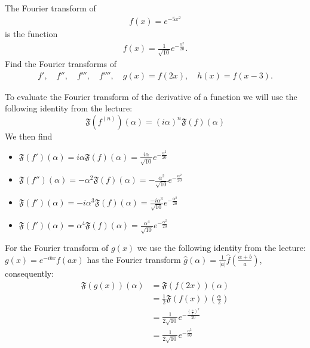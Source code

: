 \documentclass[11pt]{article}
\begin{document}

\begin{exercise}
    The Fourier transform of 
    \begin{align*}
        f(x) = e^{-5x^2}
    \end{align*}
    is the function 
    \begin{align*}
        f(x) = \frac{1}{\sqrt{10}} e^{-\frac{\alpha^2}{20}}.
    \end{align*}
    Find the Fourier transforms of 
    \begin{align*}
     f', \quad f'', \quad f''', \quad f'''', \quad g(x) = f(2x), \quad h(x) = f(x-3).
    \end{align*}
\end{exercise}
\begin{solution}  
To evaluate the Fourier transform of the derivative of a function we will use the following identity from the lecture:
\[
    \mathfrak{F}\left(f^{(n)}\right)(\alpha)=(i \alpha)^n \mathfrak{F}(f)(\alpha)
\]
We then find 
\begin{itemize}
\item $\mathfrak{F}\left(f' \right)(\alpha) = i \alpha \mathfrak{F}(f)(\alpha) = \frac{i \alpha}{\sqrt{10}} e^{-\frac{\alpha^2}{20}}$
\item $\mathfrak{F}\left(f'' \right)(\alpha) = -\alpha^2 \mathfrak{F}(f)(\alpha) = -\frac{ \alpha^2}{\sqrt{10}} e^{-\frac{\alpha^2}{20}}$
\item $\mathfrak{F}\left(f' \right)(\alpha) = -i \alpha^3 \mathfrak{F}(f)(\alpha) = \frac{-i \alpha^3}{\sqrt{10}} e^{-\frac{\alpha^2}{20}}$
\item $\mathfrak{F}\left(f' \right)(\alpha) = \alpha^4 \mathfrak{F}(f)(\alpha) = \frac{ \alpha^4}{\sqrt{10}} e^{-\frac{\alpha^2}{20}}$
\end{itemize}
For the Fourier transform of $g(x)$ we use the following identity from the lecture: 
$g(x)=e^{-i b x} f(a x)$ has the Fourier transform
$\hat{g}(\alpha)=\frac{1}{|a|} \hat{f}\left(\frac{\alpha+b}{a}\right)$,
consequently:
\begin{align*}
    \mathfrak{F}(g(x))(\alpha) & =\mathfrak{F}(f(2 x))(\alpha) \\ & =\frac{1}{2} \mathfrak{F}(f(x))\left(\frac{\alpha}{2}\right) \\ & =\frac{1}{2 \sqrt{10}} e^{-\frac{\left(\frac{\alpha}{2}\right)^2}{20}} \\ & =\frac{1}{2 \sqrt{10}} e^{-\frac{\alpha^2}{80}}
\end{align*}

\end{solution}
\end{document}
